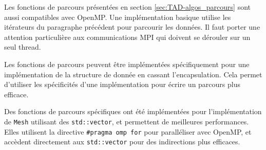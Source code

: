 Les fonctions de parcours présentées en section \ref{sec:TAD-algos_parcours} sont aussi compatibles avec OpenMP. Une implémentation basique utilise les itérateurs du paragraphe précédent pour parcourir les données. Il faut porter une attention particulière aux communications MPI qui doivent se dérouler sur un seul thread.

Les fonctions de parcours peuvent être implémentées spécifiquement pour une implémentation de la structure de donnée en cassant l'encapsulation. Cela permet d'utiliser les spécificités d'une implémentation pour écrire un parcours plus efficace.

Des fonctions de parcours spécifiques ont été implémentées pour l'implémentation de \verb|Mesh| utilisant des \verb|std::vector|, et permettent de meilleures performances. Elles utilisent la directive \verb|#pragma omp for| pour paralléliser avec OpenMP, et accèdent directement aux \verb|std::vector| pour des indirections plus efficaces.
